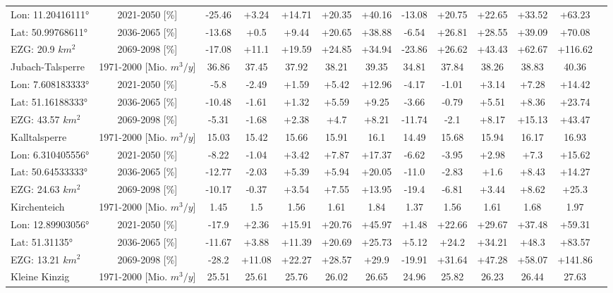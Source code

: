 \begin{longtable}{@{\extracolsep{\fill}}lc|ccccc||cccccc}
\cline{2-13} 
Lon: 11.20416111° & 2021-2050 [\%]  & -25.46 & +3.24 & +14.71 & +20.35 & +40.16 & -13.08 & +20.75 & +22.65 & +33.52 & +63.23 & \\ 
Lat: 50.99768611° & 2036-2065 [\%]  & -13.68 & +0.5 & +9.44 & +20.65 & +38.88 & -6.54 & +26.81 & +28.55 & +39.09 & +70.08 & \\ 
EZG: 20.9 $km^2$ & 2069-2098 [\%]  & -17.08 & +11.1 & +19.59 & +24.85 & +34.94 & -23.86 & +26.62 & +43.43 & +62.67 & +116.62 & \\ 
\hline 
Jubach-Talsperre & 1971-2000 [Mio. $m^3/y$]  & 36.86 & 37.45 & 37.92 & 38.21 & 39.35 & 34.81 & 37.84 & 38.26 & 38.83 & 40.36 & \\ 
\cline{2-13} 
Lon: 7.608183333° & 2021-2050 [\%]  & -5.8 & -2.49 & +1.59 & +5.42 & +12.96 & -4.17 & -1.01 & +3.14 & +7.28 & +14.42 & \\ 
Lat: 51.16188333° & 2036-2065 [\%]  & -10.48 & -1.61 & +1.32 & +5.59 & +9.25 & -3.66 & -0.79 & +5.51 & +8.36 & +23.74 & \\ 
EZG: 43.57 $km^2$ & 2069-2098 [\%]  & -5.31 & -1.68 & +2.38 & +4.7 & +8.21 & -11.74 & -2.1 & +8.17 & +15.13 & +43.47 & \\ 
\hline 
Kalltalsperre & 1971-2000 [Mio. $m^3/y$]  & 15.03 & 15.42 & 15.66 & 15.91 & 16.1 & 14.49 & 15.68 & 15.94 & 16.17 & 16.93 & \\ 
\cline{2-13} 
Lon: 6.310405556° & 2021-2050 [\%]  & -8.22 & -1.04 & +3.42 & +7.87 & +17.37 & -6.62 & -3.95 & +2.98 & +7.3 & +15.62 & \\ 
Lat: 50.64533333° & 2036-2065 [\%]  & -12.77 & -2.03 & +5.39 & +5.94 & +20.05 & -11.0 & -2.83 & +1.6 & +8.43 & +14.27 & \\ 
EZG: 24.63 $km^2$ & 2069-2098 [\%]  & -10.17 & -0.37 & +3.54 & +7.55 & +13.95 & -19.4 & -6.81 & +3.44 & +8.62 & +25.3 & \\ 
\hline 
Kirchenteich & 1971-2000 [Mio. $m^3/y$]  & 1.45 & 1.5 & 1.56 & 1.61 & 1.84 & 1.37 & 1.56 & 1.61 & 1.68 & 1.97 & \\ 
\cline{2-13} 
Lon: 12.89903056° & 2021-2050 [\%]  & -17.9 & +2.36 & +15.91 & +20.76 & +45.97 & +1.48 & +22.66 & +29.67 & +37.48 & +59.31 & \\ 
Lat: 51.31135° & 2036-2065 [\%]  & -11.67 & +3.88 & +11.39 & +20.69 & +25.73 & +5.12 & +24.2 & +34.21 & +48.3 & +83.57 & \\ 
EZG: 13.21 $km^2$ & 2069-2098 [\%]  & -28.2 & +11.08 & +22.27 & +28.57 & +29.9 & -19.91 & +31.64 & +47.28 & +58.07 & +141.86 & \\ 
\hline 
Kleine Kinzig & 1971-2000 [Mio. $m^3/y$]  & 25.51 & 25.61 & 25.76 & 26.02 & 26.65 & 24.96 & 25.82 & 26.23 & 26.44 & 27.63 & \\ 

\end{longtable}
